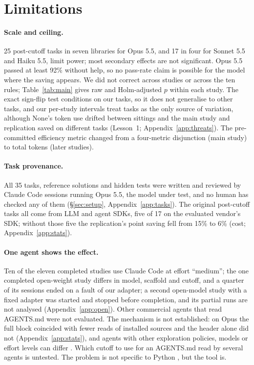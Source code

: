 \documentclass[11pt]{article}
\newcommand{\aNone}{\textsf{None}\xspace}
\begin{document}
\section*{Limitations}

\paragraph{Scale and ceiling.} 25 post-cutoff tasks in seven libraries for Opus 5.5, and 17 in four for Sonnet 5.5 and Haiku 5.5, limit power; most secondary effects are not significant. Opus 5.5 passed at least 92\% without help, so no pass-rate claim is possible for the model where the saving appears. We did not correct across studies or across the ten rules; Table~\ref{tab:main} gives raw and Holm-adjusted $p$ within each study. The exact sign-flip test conditions on our tasks, so it does not generalise to other tasks, and our per-study intervals treat tasks as the only source of variation, although \aNone's token use drifted between sittings and the main study and replication saved on different tasks (Lesson~1; Appendix~\ref{app:threats}). The pre-committed efficiency metric changed from a four-metric disjunction (main study) to total tokens (later studies).
\paragraph{Task provenance.} All 35 tasks, reference solutions and hidden tests were written and reviewed by Claude Code sessions running Opus 5.5, the model under test, and no human has checked any of them (\S\ref{sec:setup}, Appendix~\ref{app:tasks}). The original post-cutoff tasks all come from LLM and agent SDKs, five of 17 on the evaluated vendor's SDK; without those five the replication's point saving fell from 15\% to 6\% (cost; Appendix~\ref{app:stats}).
\paragraph{One agent shows the effect.} Ten of the eleven completed studies use Claude Code at effort ``medium''; the one completed open-weight study differs in model, scaffold and cutoff, and a quarter of its sessions ended on a fault of our adapter; a second open-model study with a fixed adapter was started and stopped before completion, and its partial runs are not analysed (Appendix~\ref{app:open}). Other commercial agents that read AGENTS.md were not evaluated.
The mechanism is not established: on Opus the full block coincided with fewer reads of installed sources and the header alone did not (Appendix~\ref{app:stats}), and agents with other exploration policies, models or effort levels can differ \citep{khatri2026contextfiles}. Which cutoff to use for an AGENTS.md read by several agents is untested. The problem is not specific to Python \citep{liang2025rustevo}, but the tool is.
\end{document}
